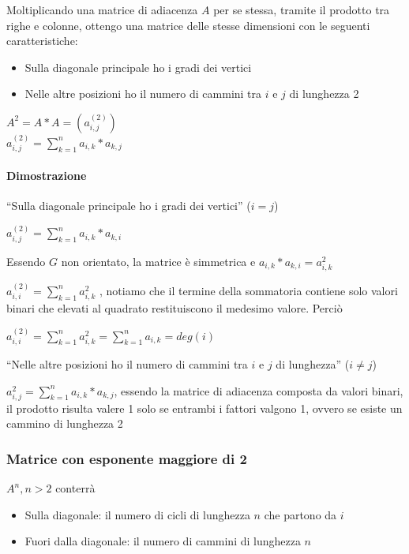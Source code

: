 {{{Moltiplicando una matrice di adiacenza $A$ per se stessa, tramite il prodotto tra righe e colonne, ottengo una matrice delle stesse dimensioni con le seguenti caratteristiche:}

\begin{itemize}
\tightlist
\item
  {Sulla diagonale principale ho i gradi dei vertici}
\item
  {Nelle altre posizioni ho il numero di cammini tra $i$ e $j$ di lunghezza 2}
\end{itemize}

$A^2 = A*A = (a^{(2)}_{i,j})$ \\
$a^{(2)}_{i,j}=\sum_{k=1}^{n}{a_{i,k}*a_{k,j}}$

\paragraph{Dimostrazione}

{``Sulla diagonale principale ho i gradi dei vertici'' ($i=j$)}

$a^{(2)}_{i,j}=\sum_{k=1}^{n}{a_{i,k}*a_{k,i}}$

{Essendo $G$ non orientato, la matrice è simmetrica e $a_{i,k}*a_{k,i} = a^2_{i,k}$}

{$a^{(2)}_{i,i} = \sum^n_{k=1}{a^2_{i,k}}$ , notiamo che il termine della sommatoria contiene solo valori binari che elevati al quadrato restituiscono il medesimo valore. Perciò}

$a^{(2)}_{i,i} = \sum^n_{k=1}{a^2_{i,k}} = \sum^n_{k=1}{a_{i,k}} = deg(i)$

{``Nelle altre posizioni ho il numero di cammini tra $i$ e $j$ di lunghezza'' ($i\neq j$)}

{$a^2_{i,j}=\sum_{k=1}^{n}{a_{i,k}*a_{k,j}}$, essendo la matrice di adiacenza composta da valori binari, il prodotto risulta valere 1 solo se entrambi i fattori valgono 1, ovvero se esiste un cammino di lunghezza 2}

\subsubsection{Matrice con esponente maggiore di 2}

{$A^n, n > 2$ conterrà}

\begin{itemize}
\tightlist
\item
  {Sulla diagonale: il numero di cicli di lunghezza $n$ che partono da $i$}
\item
  {Fuori dalla diagonale: il numero di cammini di lunghezza $n$}
\end{itemize}

}}
